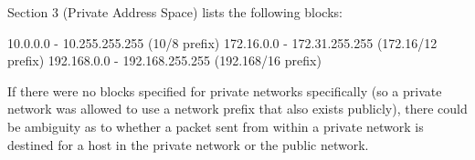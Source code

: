 Section 3 (Private Address Space) lists the following blocks:

10.0.0.0        -   10.255.255.255  (10/8 prefix)
172.16.0.0      -   172.31.255.255  (172.16/12 prefix)
192.168.0.0     -   192.168.255.255 (192.168/16 prefix)

If there were no blocks specified for private networks specifically (so a private network was allowed to use a network prefix that also exists publicly), there could be ambiguity as to whether a packet sent from within a private network is destined for a host in the private network or the public network.